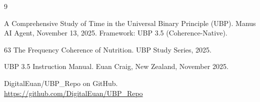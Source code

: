 \documentclass[12pt, a4paper]{article}
\begin{document}
\begin{thebibliography}{9}

A Comprehensive Study of Time in the Universal Binary Principle (UBP).
Manus AI Agent, November 13, 2025.
Framework: UBP 3.5 (Coherence-Native).

63 The Frequency Coherence of Nutrition.
UBP Study Series, 2025.

UBP 3.5 Instruction Manual.
Euan Craig, New Zealand, November 2025.

DigitalEuan/UBP\_Repo on GitHub.
\url{https://github.com/DigitalEuan/UBP_Repo}

\end{thebibliography}
\end{document}
